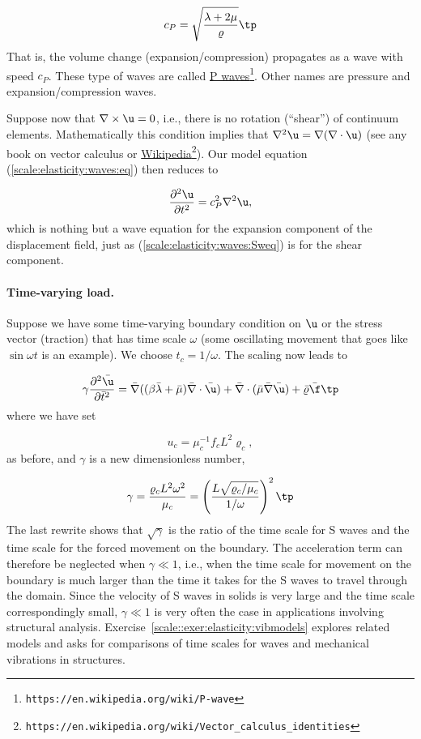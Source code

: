 \documentclass[graybox,envcountchap,sectrefs,final]{svmonodo}
\begin{document}
\[ c_P = \sqrt{\frac{\lambda +2\mu}{\varrho}}\tp\]
That is, the volume change (expansion/compression)
propagates as a wave with speed $c_P$.
These type of waves are called \href{{https://en.wikipedia.org/wiki/P-wave}}{P waves}\footnote{\texttt{https://en.wikipedia.org/wiki/P-wave}}. Other names are pressure and expansion/compression waves.

Suppose now that $\nabla\times\u =0$, i.e., there is no rotation (``shear'') of
continuum elements. Mathematically this condition implies that
$\nabla^2\u = \nabla(\nabla\cdot\u)$ (see any book on vector calculus
or \href{{https://en.wikipedia.org/wiki/Vector_calculus_identities}}{Wikipedia}\footnote{\texttt{https://en.wikipedia.org/wiki/Vector\_calculus\_identities}}).
Our model equation (\ref{scale:elasticity:waves:eq}) then reduces to

\[ \frac{\partial^2\u}{\partial t^2} = c_P^2\nabla^2\u,\]
\label{scale:elasticity:waves:Pweq}
which is nothing but a wave equation for the expansion component of the
displacement field, just as (\ref{scale:elasticity:waves:Sweq}) is for the
shear component.


\paragraph{Time-varying load.}
Suppose we have some time-varying boundary condition on $\u$ or the
stress vector (traction) that has time scale $\omega$ (some
oscillating movement that goes like $\sin\omega t$ is an example). We
choose $t_c=1/\omega$.  The scaling now leads to

\[
\gamma
\frac{\partial^2\bar \u}{\partial \bar t^2} =
\bar \nabla ((\beta\bar\lambda +
\bar\mu)\bar \nabla\cdot\bar \u) +
\bar \nabla\cdot(\bar \mu\bar \nabla\bar \u) +
\bar\varrho\bar\f\tp
\]
where we have set

\[ u_c = \mu_c^{-1}f_cL^2\varrho_c,\]
as before, and $\gamma$ is a new dimensionless number,

\[ \gamma = \frac{\varrho_cL^2 \omega^2}{\mu_c} =
\left(\frac{L\sqrt{\varrho_c/\mu_c}}{1/\omega}\right)^2\tp\]
The last rewrite shows that $\sqrt{\gamma}$ is the ratio of
the time scale for S waves and the time scale for the forced
movement on the boundary. The acceleration term can therefore
be neglected when $\gamma\ll 1$, i.e., when the time scale
for movement on the boundary is much larger than the time it
takes for the S waves to travel through the domain.
Since the velocity of S waves in solids is very large and
the time scale correspondingly small, $\gamma\ll 1$
is very often the case in applications involving structural analysis.
Exercise~\ref{scale::exer:elasticity:vibmodels} explores related
models and asks for comparisons of time scales for waves and
mechanical vibrations in structures.
\end{document}
